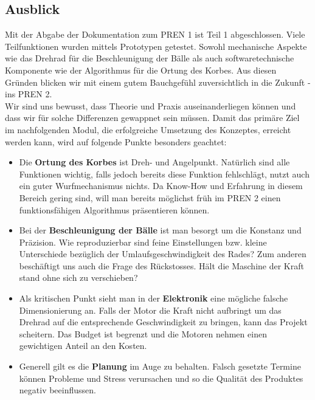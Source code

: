 \subsection{Ausblick}
Mit der Abgabe der Dokumentation zum PREN 1 ist Teil 1 abgeschlossen. Viele Teilfunktionen wurden mittels Prototypen getestet. Sowohl mechanische Aspekte wie das Drehrad für die Beschleunigung der Bälle als auch softwaretechnische Komponente wie der Algorithmus für die Ortung des Korbes. Aus diesen Gründen blicken wir mit einem gutem Bauchgefühl zuversichtlich in die Zukunft - ins PREN 2. \\
Wir sind uns bewusst, dass Theorie und Praxis auseinanderliegen können und dass wir für solche Differenzen gewappnet sein müssen. Damit das primäre Ziel im nachfolgenden Modul, die erfolgreiche Umsetzung des Konzeptes, erreicht werden kann, wird auf folgende Punkte besonders geachtet:

\begin{itemize}
	\item Die \textbf{Ortung des Korbes} ist Dreh- und Angelpunkt. Natürlich sind alle Funktionen wichtig, falls jedoch bereits diese Funktion fehlschlägt, nutzt auch ein guter Wurfmechanismus nichts. Da Know-How und Erfahrung in diesem Bereich gering sind, will man bereits möglichst früh im PREN 2 einen funktionsfähigen Algorithmus präsentieren können.
	
	\item Bei der \textbf{Beschleunigung der Bälle} ist man besorgt um die Konstanz und Präzision. Wie reproduzierbar sind feine Einstellungen bzw. kleine Unterschiede bezüglich der Umlaufsgeschwindigkeit des Rades? Zum anderen beschäftigt uns auch die Frage des Rückstosses. Hält die Maschine der Kraft stand ohne sich zu verschieben?
	
	\item Als kritischen Punkt sieht man in der \textbf{Elektronik} eine mögliche falsche Dimensionierung an. Falls der Motor die Kraft nicht aufbringt um das Drehrad auf die entsprechende Geschwindigkeit zu bringen, kann das Projekt scheitern. Das Budget ist begrenzt und die Motoren nehmen einen gewichtigen Anteil an den Kosten.
	
	\item Generell gilt es die \textbf{Planung} im Auge zu behalten. Falsch gesetzte Termine können Probleme und Stress verursachen und so die Qualität des Produktes negativ beeinflussen.
	
\end{itemize}